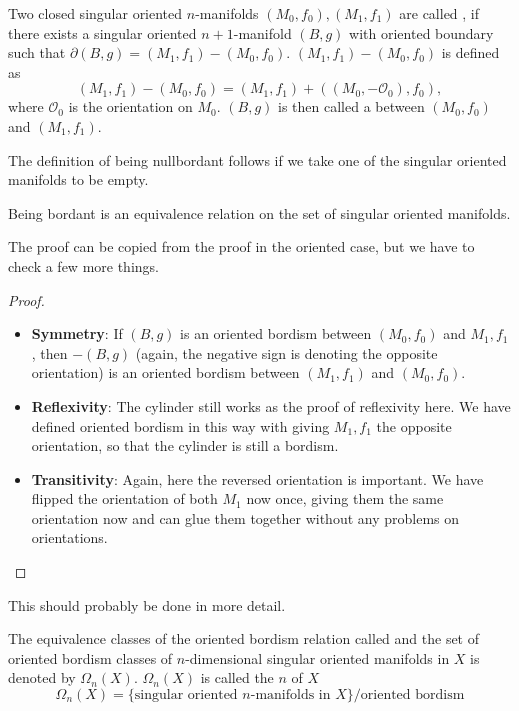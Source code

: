 \documentclass[a4paper,11pt]{article}
\begin{document}
\begin{definition}
    Two closed singular oriented \(n\)-manifolds \((M_0,f_0),(M_1,f_1)\) are called , if there exists a singular oriented \(n+1\)-manifold \((B,g)\) with oriented boundary such that \(\partial (B,g) = (M_1,f_1)-(M_0,f_0)\). \((M_1,f_1)-(M_0,f_0)\) is defined as
    \[(M_1,f_1)-(M_0,f_0)=(M_1,f_1)+((M_0,-\mathcal{O}_0),f_0),\]
    where \(\mathcal{O}_0\) is the orientation on \(M_0\). \((B,g)\) is then called a  between \((M_0,f_0)\) and \((M_1,f_1)\).
\end{definition}

\begin{remark}
    The definition of being nullbordant follows if we take one of the singular oriented manifolds to be empty.
\end{remark}

\begin{proposition}\label{oriented eq. rel}
    Being bordant is an equivalence relation on the set of singular oriented manifolds.
\end{proposition}

The proof can be copied from the proof in the oriented case, but we have to check a few more things.

\begin{proof}
    \begin{itemize}
        \item \textbf{Symmetry}: If \((B,g)\) is an oriented bordism between \((M_0,f_0)\) and \(M_1,f_1\), then \(-(B,g)\) (again, the negative sign is denoting the opposite orientation) is an oriented bordism between \((M_1,f_1)\) and \((M_0,f_0)\).
        \item \textbf{Reflexivity}: The cylinder still works as the proof of reflexivity here. We have defined oriented bordism in this way with giving \(M_1,f_1\) the opposite orientation, so that the cylinder is still a bordism.
        \item \textbf{Transitivity}: Again, here the reversed orientation is important. We have flipped the orientation of both \(M_1\) now once, giving them the same orientation now and can glue them together without any problems on orientations.
    \end{itemize}
\end{proof}
This should probably be done in more detail.

\begin{definition}
    The equivalence classes of the oriented bordism relation called  and the set of oriented bordism classes of \(n\)-dimensional singular oriented manifolds in \(X\) is denoted by \(\Omega_n(X)\). \(\Omega_n(X)\) is called the \(n\) of \(X\)
    \[\Omega_n(X)=\{\text{singular oriented \(n\)-manifolds in } X\}\big/\text{oriented bordism}\]
\end{definition}
\end{document}
